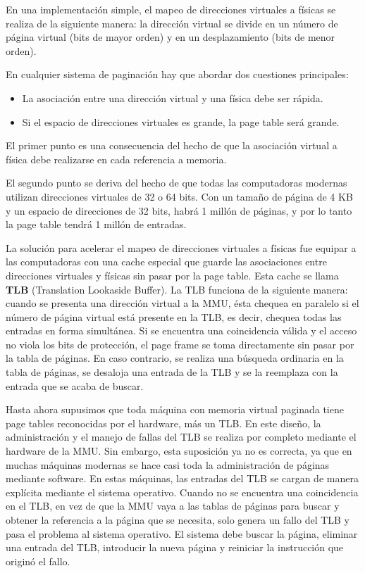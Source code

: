 En una implementación simple, el mapeo de direcciones virtuales a físicas se realiza de la siguiente manera: la dirección virtual se divide en un número de página virtual (bits de mayor orden) y en un desplazamiento (bits de menor orden).

En cualquier sistema de paginación hay que abordar dos cuestiones principales:

\begin{itemize}
\item La asociación entre una dirección virtual y una física debe ser rápida.

\item Si el espacio de direcciones virtuales es grande, la page table será grande.
\end{itemize}

El primer punto es una consecuencia del hecho de que la asociación virtual a física debe realizarse en cada referencia a memoria.

El segundo punto se deriva del hecho de que todas las computadoras modernas utilizan direcciones virtuales de 32 o 64 bits. Con un tamaño de página de 4 KB y un espacio de direcciones de 32 bits, habrá 1 millón de páginas, y por lo tanto la page table tendrá 1 millón de entradas.

La solución para acelerar el mapeo de direcciones virtuales a físicas fue equipar a las computadoras con una cache especial que guarde las asociaciones entre direcciones virtuales y físicas sin pasar por la page table. Esta cache se llama \textbf{TLB} (Translation Lookaside Buffer). La TLB funciona de la siguiente manera: cuando se presenta una dirección virtual a la MMU, ésta chequea en paralelo si el número de página virtual está presente en la TLB, es decir, chequea todas las entradas en forma simultánea. Si se encuentra una coincidencia válida y el acceso no viola los bits de protección, el page frame se toma directamente sin pasar por la tabla de páginas. En caso contrario, se realiza una búsqueda ordinaria en la tabla de páginas, se desaloja una entrada de la TLB y se la reemplaza con la entrada que se acaba de buscar.

Hasta ahora supusimos que toda máquina con memoria virtual paginada tiene page tables reconocidas por el hardware, más un TLB. En este diseño, la administración y el manejo de fallas del TLB se realiza por completo mediante el hardware de la MMU. Sin embargo, esta suposición ya no es correcta, ya que en muchas máquinas modernas se hace casi toda la administración de páginas mediante software. En estas máquinas, las entradas del TLB se cargan de manera explícita mediante el sistema operativo. Cuando no se encuentra una coincidencia en el TLB, en vez de que la MMU vaya a las tablas de páginas para buscar y obtener la referencia a la página que se necesita, solo genera un fallo del TLB y pasa el problema al sistema operativo. El sistema debe buscar la página, eliminar una entrada del TLB, introducir la nueva página y reiniciar la instrucción que originó el fallo.

